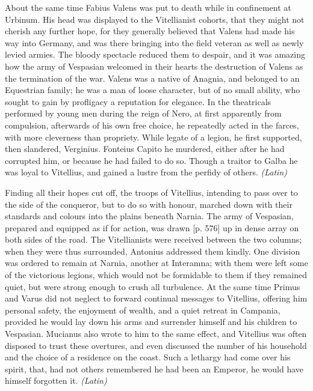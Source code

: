 
About the same time Fabius Valens was put to death while in confinement at Urbinum. His head was displayed to the Vitellianist cohorts, that they might not cherish any further hope, for they generally believed that Valens had made his way into Germany, and was there bringing into the field veteran as well as newly levied armies. The bloody spectacle reduced them to despair, and it was amazing how the army of Vespasian welcomed in their hearts the destruction of Valens as the termination of the war. Valens was a native of Anagnia, and belonged to an Equestrian family; he was a man of loose character, but of no small ability, who sought to gain by profligacy a reputation for elegance. In the theatricals performed by young men during the reign of Nero, at first apparently from compulsion, afterwards of his own free choice, he repeatedly acted in the farces, with more cleverness than propriety. While legate of a legion, he first supported, then slandered, Verginius. Fonteius Capito he murdered, either after he had corrupted him, or because he had failed to do so. Though a traitor to Galba he was loyal to Vitellius, and gained a lustre from the perfidy of others. \emph{(Latin)}


Finding all their hopes cut off, the troops of Vitellius, intending to pass over to the side of the conqueror, but to do so with honour, marched down with their standards and colours into the plains beneath Narnia. The army of Vespasian, prepared and equipped as if for action, was drawn [p. 576] up in dense array on both sides of the road. The Vitellianists were received between the two columns; when they were thus surrounded, Antonius addressed them kindly. One division was ordered to remain at Narnia, another at Interamna; with them were left some of the victorious legions, which would not be formidable to them if they remained quiet, but were strong enough to crush all turbulence. At the same time Primus and Varus did not neglect to forward continual messages to Vitellius, offering him personal safety, the enjoyment of wealth, and a quiet retreat in Campania, provided he would lay down his arms and surrender himself and his children to Vespasian. Mucianus also wrote to him to the same effect, and Vitellius was often disposed to trust these overtures, and even discussed the number of his household and the choice of a residence on the coast. Such a lethargy had come over his spirit, that, had not others remembered he had been an Emperor, he would have himself forgotten it. \emph{(Latin)}

